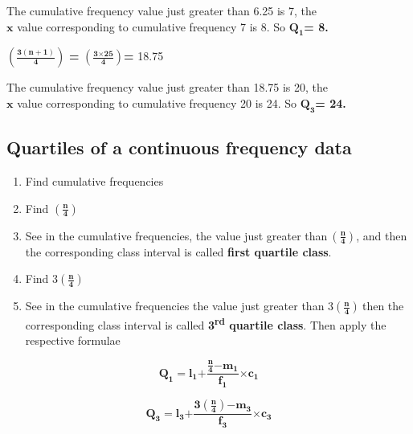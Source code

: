\documentclass[
]{book}
\begin{document}
The cumulative frequency value just greater than 6.25 is 7, the\\
\(\mathbf{x}\) value corresponding to cumulative frequency 7 is 8. So
\(\mathbf{Q}_{\mathbf{1}}\)\textbf{= 8.}

\(\left( \frac{\mathbf{3(n + 1)}}{\mathbf{4}} \right)\) \textbf{=}
\(\left( \frac{\mathbf{3}\mathbf{\times}\mathbf{25}}{\mathbf{4}} \right)\)\textbf{=}
18.75

The cumulative frequency value just greater than 18.75 is 20, the\\
\(\mathbf{x}\) value corresponding to cumulative frequency 20 is 24. So
\(\mathbf{Q}_{\mathbf{3}}\)\textbf{= 24.}

\hypertarget{quartiles-of-a-continuous-frequency-data}{%
\subsection{Quartiles of a continuous frequency data}\label{quartiles-of-a-continuous-frequency-data}}

\begin{enumerate}
\def\labelenumi{\arabic{enumi}.}
\item
  Find cumulative frequencies
\item
  Find \(\left( \frac{\mathbf{n}}{\mathbf{4}} \right)\)
\item
  See in the cumulative frequencies, the value just greater
  than\(\ \left( \frac{\mathbf{n}}{\mathbf{4}} \right)\), and then the
  corresponding class interval is called \textbf{first quartile class}.
\item
  Find \(3\left( \frac{\mathbf{n}}{\mathbf{4}} \right)\)
\item
  See in the cumulative frequencies the value just greater than
  \(3\left( \frac{\mathbf{n}}{\mathbf{4}} \right)\mathbf{\ }\)then the
  corresponding class interval is called \textbf{3\textsuperscript{rd} quartile class}.
  Then apply the respective formulae
\end{enumerate}

\[\mathbf{Q}_{\mathbf{1}}\mathbf{=}\mathbf{l}_{\mathbf{1}}\mathbf{+}\frac{\frac{\mathbf{n}}{\mathbf{4}}\mathbf{-}\mathbf{m}_{\mathbf{1}}}{\mathbf{f}_{\mathbf{1}}}\mathbf{\times}\mathbf{c}_{\mathbf{1}}\]

\[\mathbf{Q}_{\mathbf{3}}\mathbf{=}\mathbf{l}_{\mathbf{3}}\mathbf{+}\frac{\mathbf{3}\left( \frac{\mathbf{n}}{\mathbf{4}} \right)\mathbf{-}\mathbf{m}_{\mathbf{3}}}{\mathbf{f}_{\mathbf{3}}}\mathbf{\times}\mathbf{c}_{\mathbf{3}}\]
\end{document}
